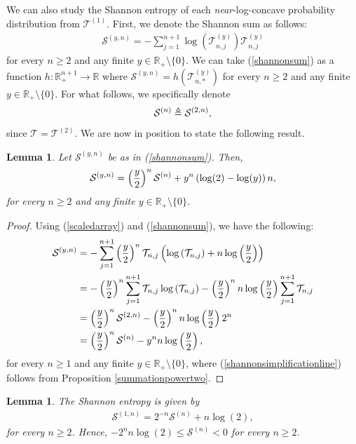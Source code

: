\documentclass[a4paper,12pt]{article}
\newtheorem{lem}[thm]{Lemma}
\def\R{\mathbb{R}}
\def\T{\mathcal{T}}
\begin{document}
We can also study the Shannon entropy of each \emph{near}-log-concave probability distribution from $\T^{(1)}$. First, we denote the Shannon sum as follows:
\begin{align}
\mathcal{S}^{(y,n)} = -\sum_{j=1}^{n+1} \log\left(\T^{(y)}_{n,j}\right)\T^{(y)}_{n,j} \label{shannonsum}
\end{align}
for every $n\geq 2$ and any finite $y\in\R_+\setminus\{0\}$. We can take (\ref{shannonsum}) as a function $h : \R^{n+1}_+ \rightarrow \R$ where $\mathcal{S}^{(y,n)} = h(\T^{(y)}_{n,*})$ for every $n\geq 2$ and any finite $y\in\R_+\setminus\{0\}$. For what follows, we specifically denote
\begin{align}
\mathcal{S}^{(n)} \triangleq \mathcal{S}^{(2,n)}, \notag 
\end{align}
since $\T = \T^{(2)}$. We are now in position to state the following result.
\begin{lem}
\label{generalshannonsumresult}
Let $\mathcal{S}^{(y,n)}$ be as in (\ref{shannonsum}). Then,
\begin{align}
\mathcal{S}^{(y,n)} =\left(\frac{y}{2}\right)^n\mathcal{S}^{(n)}  + y^n\left(\log(2) - \log(y)\right)n, \notag
\end{align}
for every $n\geq 2$ and any finite $y\in\R_+\setminus\{0\}$.
\end{lem}
\begin{proof}
Using (\ref{scaledarray}) and (\ref{shannonsum}), we have the following:
\begin{align}
\mathcal{S}^{(y,n)} &= - \sum_{j=1}^{n+1} \left( \frac{y}{2}\right)^n \T_{n,j}\left(\log\left(\T_{n,j}\right) + n\log\left(\frac{y}{2}\right) \right) \notag \\ 
&= -\left(\frac{y}{2}\right)^n \sum_{j=1}^{n+1} \T_{n,j}\log\left(\T_{n,j}\right) - \left( \frac{y}{2}\right)^nn\log\left(\frac{y}{2}\right) \sum_{j=1}^{n+1} \T_{n,j} \notag \\
&= \left(\frac{y}{2}\right)^n \mathcal{S}^{(2,n)} - \left( \frac{y}{2}\right)^nn\log\left(\frac{y}{2}\right)2^n \label{shannonsimplificationline} \\
&= \left(\frac{y}{2}\right)^n \mathcal{S}^{(n)} - y^n n\log\left(\frac{y}{2}\right), \notag
\end{align}
for every $n\geq 1$ and any finite $y\in\R_+\setminus\{0\}$, where (\ref{shannonsimplificationline}) follows from Proposition \ref{summationpowertwo}.
\end{proof}
\begin{lem}
\label{shannonentropyspecificres}
The Shannon entropy is given by
\begin{align}
\mathcal{S}^{(1,n)} = 2^{-n}\mathcal{S}^{(n)}  + n\log(2), \label{shannonexpressionformula}
\end{align}
for every $n\geq 2$. Hence, $-2^nn\log(2) \leq \mathcal{S}^{(n)} < 0$ for every $n\geq 2$.
\end{lem}
\end{document}
